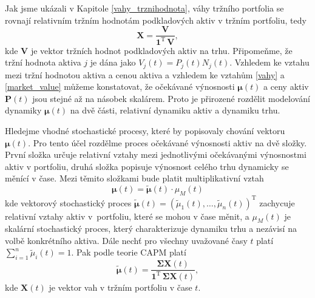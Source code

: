 \documentclass[a4paper,12pt]{report}
\theoremstyle{definition} \newtheorem{definice}[veta]{Definice}
\theoremstyle{remark}
\begin{document}
Jak jsme ukázali v Kapitole \ref{vahy_trznihodnota}, váhy tržního portfolia se rovnají relativním tržním hodnotám podkladových aktiv v tržním portfoliu, tedy
\begin{equation} \label{market_value}
\boldsymbol{X}=\frac{\boldsymbol{V}}{\boldsymbol{1}^\mathrm{T}\,\boldsymbol{V}},
\end{equation}
kde $\boldsymbol{V}$ je vektor tržních hodnot podkladových aktiv na trhu.
Připomeňme, že tržní hodnota aktiva $j$ je dána jako $V_j(t)=P_j(t)N_j(t)$.
Vzhledem ke vztahu mezi tržní hodnotou aktiva a cenou aktiva a vzhledem ke vztahům \eqref{vahy} a \eqref{market_value} můžeme konstatovat, že očekávané výnosnosti $\boldsymbol{\mu}(t)$ a ceny aktiv $\boldsymbol{P}(t)$ jsou stejné až na násobek skalárem. 
Proto je přirozené rozdělit modelování dynamiky $\boldsymbol{\mu}(t)$ na dvě části, relativní dynamiku aktiv a dynamiku trhu.


Hledejme vhodné stochastické procesy, které by popisovaly chování vektoru $\boldsymbol{\mu}(t)$.
Pro tento účel rozdělme proces očekávané výnosnosti aktiv na dvě složky.
První složka určuje relativní vztahy mezi jednotlivými očekávanými výnosnostmi aktiv v portfoliu, druhá složka popisuje výnosnost celého trhu dynamicky se měnící v čase.  
Mezi těmito složkami bude platit multiplikativní vztah
\begin{equation} \label{vynos}
\boldsymbol{\mu}(t) =\tilde{\boldsymbol{\mu}}(t)\cdot \mu_M(t)
\end{equation}
kde
vektorový stochastický proces $\tilde{\boldsymbol{\mu}}(t)=(\tilde{\mu}_1(t),\dots,\tilde{\mu}_n(t))^\mathrm{T}$ zachycuje relativní vztahy aktiv v~portfoliu, které se mohou v čase měnit, a
$\mu_M(t)$ je skalární stochastický proces, který charakterizuje dynamiku trhu a nezávisí na volbě konkrétního aktiva.
Dále nechť pro všechny uvažované časy $t$ platí $\sum_{i=1}^n\tilde{\mu}_i(t)=1$.
Pak podle teorie CAPM platí 
\begin{equation} \label{vahy_mu}
\tilde{\boldsymbol{\mu}}(t)=\frac{\boldsymbol{\Sigma}\boldsymbol{X}(t)}{\boldsymbol{1}^\mathrm{T}\,\boldsymbol{\Sigma}\boldsymbol{X}(t)},
\end{equation}
kde $\boldsymbol{X}(t)$ je vektor vah v tržním portfoliu v čase $t$.
\end{document}

